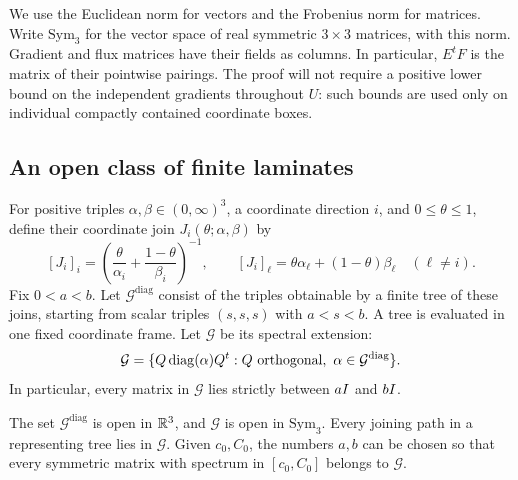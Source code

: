 We use the Euclidean norm for vectors and the Frobenius norm for
matrices. Write $\mathrm{Sym}_3$ for the vector space of real symmetric
$3\times3$ matrices, with this norm. Gradient and flux matrices have
their fields as columns.
In particular, $E^tF$ is the matrix of their pointwise pairings.
The proof will not require a positive lower bound on the independent
gradients throughout $U$: such bounds are used only on individual
compactly contained coordinate boxes.

\subsection{An open class of finite laminates}

For positive triples $\alpha,\beta\in(0,\infty)^3$, a coordinate
direction $i$, and $0\leq\theta\leq1$, define their coordinate join
$J_i(\theta;\alpha,\beta)$ by
\begin{equation}
 \label{sc:join}
 [J_i]_i=\left(\frac{\theta}{\alpha_i}
                  +\frac{1-\theta}{\beta_i}\right)^{-1},
 \qquad
 [J_i]_\ell=\theta\alpha_\ell+(1-\theta)\beta_\ell
 \quad(\ell\ne i).
\end{equation}
Fix $0<a<b$. Let $\mathcal G^{\mathrm{diag}}$ consist of the
triples obtainable by a finite tree of these joins, starting from
scalar triples $(s,s,s)$ with $a<s<b$. A tree is evaluated in one
fixed coordinate frame. Let $\mathcal G$ be its spectral extension:
\[
 \mathcal G=
 \{Q\operatorname{diag}(\alpha)Q^t:
       Q\text{ orthogonal},\ \alpha\in\mathcal G^{\mathrm{diag}}\}.
\]
In particular, every matrix in $\mathcal G$ lies strictly between
$aI$ and $bI$.

\begin{lemma}
\label{sc:open-class}
The set $\mathcal G^{\mathrm{diag}}$ is open in $\mathbb R^3$, and
$\mathcal G$ is open in $\mathrm{Sym}_3$.
Every joining path in a representing tree lies in $\mathcal G$.
Given $c_0,C_0$, the numbers $a,b$ can be chosen so that every
symmetric matrix with spectrum in $[c_0,C_0]$ belongs to
$\mathcal G$.
\end{lemma}

